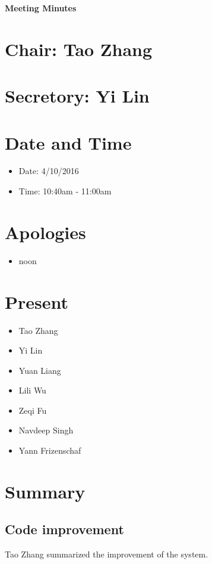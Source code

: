 \documentclass[11pt, a4paper]{article}
\begin{document}
\vspace*{15pt}
\begin{center}
\huge \bf Meeting Minutes
\end{center}

\section*{Chair: Tao Zhang}
\section*{Secretory: Yi Lin}
\vspace*{10pt}

\section{Date and Time}
\begin{itemize}
\item Date: 4/10/2016
\item Time: 10:40am - 11:00am
\end{itemize}

\section{Apologies}
\begin{itemize}
\item noon
\end{itemize}

\section{Present}
\begin{itemize}
\item Tao Zhang
\item Yi Lin
\item Yuan Liang
\item Lili Wu
\item Zeqi Fu
\item Navdeep Singh
\item Yann Frizenschaf
\end{itemize}



\section{Summary }
\subsection{Code improvement}
Tao Zhang summarized  the improvement  of the system.
 
\end{document}

